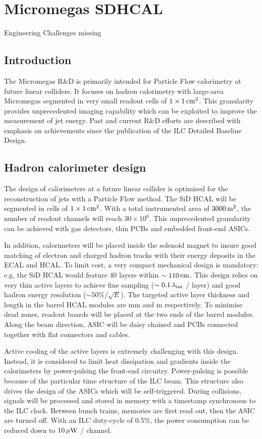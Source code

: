 \section{Micromegas SDHCAL}
{\color{red}Engineering Challenges missing}
\subsection{Introduction}
The Micromegas R\&D is primarily intended for Particle Flow calorimetry at future linear colliders. It focuses on hadron calorimetry with large-area Micromegas segmented in very small readout cells of $1\times\unit[1]{cm^{2}}$. This granularity provides unprecedented imaging capability which can be exploited to improve the measurement of jet energy. Past and current R\&D efforts are described with emphasis on achievements since the publication of the ILC Detailed Baseline Design.


\subsection{Hadron calorimeter design}

The design of calorimeters at a future linear collider is optimised for the reconstruction of jets with a Particle Flow method. The SiD HCAL will be segmented in cells of $1\times \unit[1]{cm^2}$. With a total instrumented area of $\unit[3000]{m^{2}}$, the number of readout channels will reach $30\times 10^{6}$. This unprecedented granularity can be achieved with gas detectors, thin PCBs and embedded front-end ASICs.

In addition, calorimeters will be placed inside the solenoid magnet to insure good matching of electron and charged hadron tracks with their energy deposits in the ECAL and HCAL. To limit cost, a very compact mechanical design is mandatory: e.g. the SiD HCAL would feature 40 layers within $\sim\unit[110]{cm}$. This design relies on very thin active layers to achieve fine sampling ($\sim\unit[0.1]{\lambda_{int}}$ / layer) and good hadron energy resolution ($\sim 50\% / \sqrt{E}$). The targeted active layer thickness and length in the barrel HCAL modules are \unit[8]{mm} and \unit[3]{m} respectively. To minimise dead zones, readout boards will be placed at the two ends of the barrel modules. Along the beam direction, ASIC will be daisy chained and PCBs connected together with flat connectors and cables.

Active cooling of the active layers is extremely challenging with this design. Instead, it is considered to limit heat dissipation and gradients inside the calorimeters by power-pulsing the front-end circuitry. Power-pulsing is possible because of the particular time structure of the ILC beam. This structure also drives the design of the ASICs which will be self-triggered. During collisions, signals will be processed and stored in memory with a timestamp synchronous to the ILC clock. Between bunch trains, memories are first read out, then the ASIC are turned off. With an ILC duty-cycle of 0.5\%, the power consumption can be reduced down to $\unit[10]{\mu W}$ / channel.

